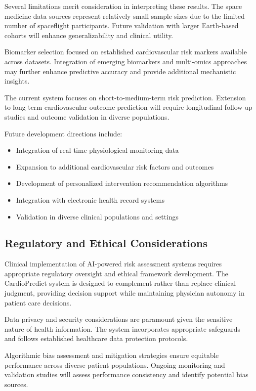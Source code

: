 \documentclass[11pt,a4paper]{article}
\begin{document}
Several limitations merit consideration in interpreting these results. The space medicine data sources represent relatively small sample sizes due to the limited number of spaceflight participants. Future validation with larger Earth-based cohorts will enhance generalizability and clinical utility.

Biomarker selection focused on established cardiovascular risk markers available across datasets. Integration of emerging biomarkers and multi-omics approaches may further enhance predictive accuracy and provide additional mechanistic insights.

The current system focuses on short-to-medium-term risk prediction. Extension to long-term cardiovascular outcome prediction will require longitudinal follow-up studies and outcome validation in diverse populations.

Future development directions include:

\begin{itemize}
    \item Integration of real-time physiological monitoring data
    \item Expansion to additional cardiovascular risk factors and outcomes
    \item Development of personalized intervention recommendation algorithms
    \item Integration with electronic health record systems
    \item Validation in diverse clinical populations and settings
\end{itemize}

\subsection{Regulatory and Ethical Considerations}

Clinical implementation of AI-powered risk assessment systems requires appropriate regulatory oversight and ethical framework development. The CardioPredict system is designed to complement rather than replace clinical judgment, providing decision support while maintaining physician autonomy in patient care decisions.

Data privacy and security considerations are paramount given the sensitive nature of health information. The system incorporates appropriate safeguards and follows established healthcare data protection protocols.

Algorithmic bias assessment and mitigation strategies ensure equitable performance across diverse patient populations. Ongoing monitoring and validation studies will assess performance consistency and identify potential bias sources.
\end{document}
